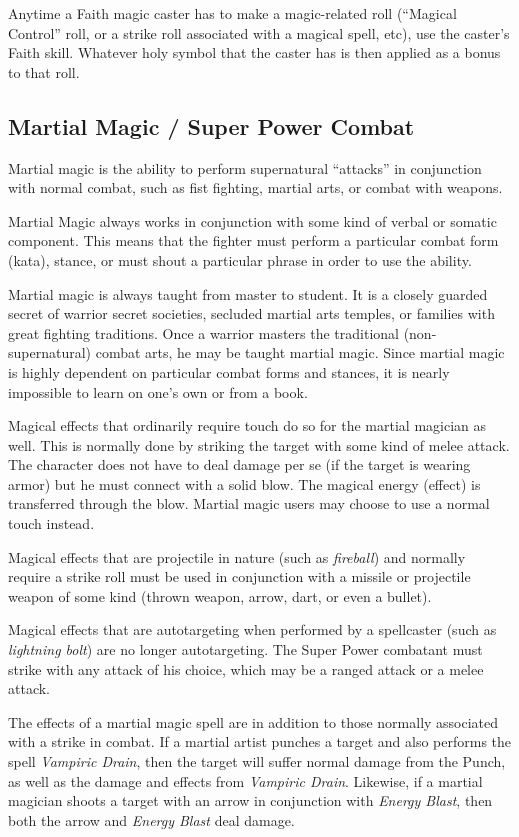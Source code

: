 Anytime a Faith magic caster has to make a magic-related roll
(``Magical Control'' roll, or a strike roll associated with a magical
spell, etc), use the caster's Faith skill.  Whatever holy symbol that
the caster has is then applied as a bonus to that roll.

\subsection{Martial Magic / Super Power Combat}

Martial magic is the ability to perform supernatural ``attacks'' in
conjunction with normal combat, such as fist fighting, martial arts,
or combat with weapons.

Martial Magic always works in conjunction with some kind of verbal or
somatic component.  This means that the fighter must perform a
particular combat form (kata), stance, or must shout a particular
phrase in order to use the ability.

Martial magic is always taught from master to student.  It is a
closely guarded secret of warrior secret societies, secluded martial
arts temples, or families with great fighting traditions.  Once a
warrior masters the traditional (non-supernatural) combat arts, he may
be taught martial magic.  Since martial magic is highly dependent on
particular combat forms and stances, it is nearly impossible to learn
on one's own or from a book.

Magical effects that ordinarily require touch do so for the martial
magician as well.  This is normally done by striking the target with
some kind of melee attack.  The character does not have to deal damage
per se (if the target is wearing armor) but he must connect with a
solid blow.  The magical energy (effect) is transferred through the
blow.  Martial magic users may choose to use a normal touch instead.

Magical effects that are projectile in nature (such as
\emph{fireball}) and normally require a strike roll must be used in
conjunction with a missile or projectile weapon of some kind (thrown
weapon, arrow, dart, or even a bullet).

Magical effects that are autotargeting when performed by a spellcaster
(such as \emph{lightning bolt}) are no longer autotargeting.  The
Super Power combatant must strike with any attack of his choice, which
may be a ranged attack or a melee attack.

The effects of a martial magic spell are in addition to those normally
associated with a strike in combat.  If a martial artist punches a
target and also performs the spell \emph{Vampiric Drain}, then the
target will suffer normal damage from the Punch, as well as the damage
and effects from \emph{Vampiric Drain}.  Likewise, if a martial
magician shoots a target with an arrow in conjunction with
\emph{Energy Blast}, then both the arrow and \emph{Energy Blast} deal
damage.

